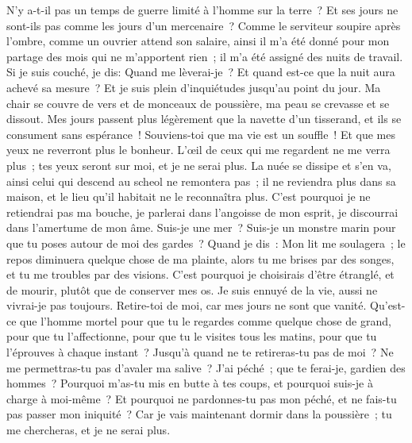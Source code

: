 \begin{multicols}{2}
\VerseOne{}N'y a-t-il pas un temps de guerre limité à l'homme sur la terre~? Et ses jours ne sont-ils pas comme les jours d'un mercenaire~?
Comme le serviteur soupire après l'ombre, comme un ouvrier attend son salaire, 
ainsi il m'a été donné pour mon partage des mois qui ne m'apportent rien~; il m'a été assigné des nuits de travail.
Si je suis couché, je dis: Quand me lèverai-je~? Et quand est-ce que la nuit aura achevé sa mesure~? Et je suis plein d'inquiétudes jusqu'au point du jour.
Ma chair se couvre de vers et de monceaux de poussière, ma peau se crevasse et se dissout.
Mes jours passent plus légèrement que la navette d'un tisserand, et ils se consument sans espérance~!
Souviens-toi que ma vie est un souffle~! Et que mes yeux ne reverront plus le bonheur.
L'œil de ceux qui me regardent ne me verra plus~; tes yeux seront sur moi, et je ne serai plus.
La nuée se dissipe et s'en va, ainsi celui qui descend au scheol ne remontera pas~;
il ne reviendra plus dans sa maison, et le lieu qu'il habitait ne le reconnaîtra plus.
C'est pourquoi je ne retiendrai pas ma bouche, je parlerai dans l'angoisse de mon esprit, je discourrai dans l'amertume de mon âme.
Suis-je une mer~? Suis-je un monstre marin pour que tu poses autour de moi des gardes~?
Quand je dis~: Mon lit me soulagera~; le repos diminuera quelque chose de ma plainte,
alors tu me brises par des songes, et tu me troubles par des visions.
C'est pourquoi je choisirais d'être étranglé, et de mourir, plutôt que de conserver mes os.
Je suis ennuyé de la vie, aussi ne vivrai-je pas toujours. Retire-toi de moi, car mes jours ne sont que vanité.
Qu'est-ce que l'homme mortel pour que tu le regardes comme quelque chose de grand, pour que tu l'affectionne,
pour que tu le visites tous les matins, pour que tu l'éprouves à chaque instant~?
Jusqu'à quand ne te retireras-tu pas de moi~? Ne me permettras-tu pas d'avaler ma salive~?
J'ai péché~; que te ferai-je, gardien des hommes~? Pourquoi m'as-tu mis en butte à tes coups, et pourquoi suis-je à charge à moi-même~?
Et pourquoi ne pardonnes-tu pas mon péché, et ne fais-tu pas passer mon iniquité~? Car je vais maintenant dormir dans la poussière~; tu me chercheras, et je ne serai plus.

\end{multicols}
